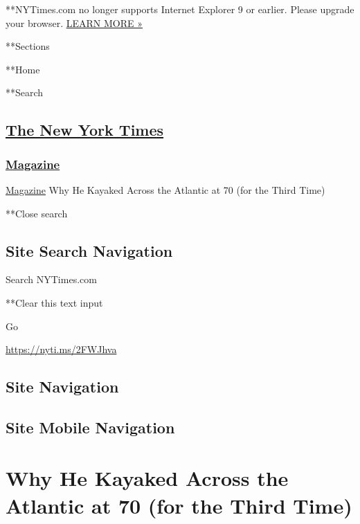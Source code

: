  **NYTimes.com no longer supports Internet Explorer 9 or earlier. Please
upgrade your browser.
\href{http://www.nytimes3xbfgragh.onion/content/help/site/ie9-support.html}{LEARN
MORE »}

**Sections

**Home

**Search

\hypertarget{the-new-york-times}{%
\subsection{\texorpdfstring{\href{http://www.nytimes3xbfgragh.onion/}{The
New York Times}}{The New York Times}}\label{the-new-york-times}}

\hypertarget{-magazine-}{%
\subsubsection{\texorpdfstring{
\href{https://www.nytimes3xbfgragh.onion/section/magazine}{Magazine}
}{ Magazine }}\label{-magazine-}}

 \href{https://www.nytimes3xbfgragh.onion/section/magazine}{Magazine}
\textbar{}Why He Kayaked Across the Atlantic at 70 (for the Third Time)

**Close search

\hypertarget{site-search-navigation}{%
\subsection{Site Search Navigation}\label{site-search-navigation}}

Search NYTimes.com

**Clear this text input

Go

\url{https://nyti.ms/2FWJhva}

\hypertarget{site-navigation}{%
\subsection{Site Navigation}\label{site-navigation}}

\hypertarget{site-mobile-navigation}{%
\subsection{Site Mobile Navigation}\label{site-mobile-navigation}}

\hypertarget{why-he-kayaked-across-the-atlantic-at-70-for-the-third-time}{%
\section{Why He Kayaked Across the Atlantic at 70 (for the Third
Time)}\label{why-he-kayaked-across-the-atlantic-at-70-for-the-third-time}}

